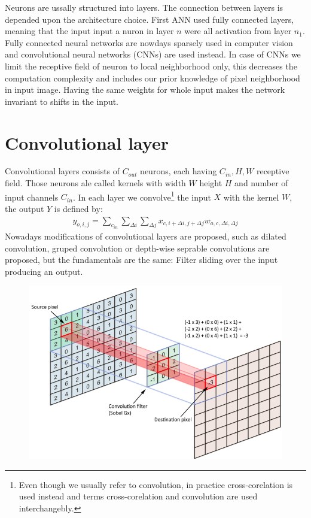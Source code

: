 Neurons are ussally structured into layers. The connection between layers is depended upon the architecture choice. First ANN used fully connected layers, meaning that the input input a nuron in layer $n$ were all activation from layer $n_1$. Fully connected neural networks are nowdays sparsely used in computer vision and convolutional neural networks (CNNs) are used instead. In case of CNNs we limit the receptive field of neuron to local neighborhood only, this decreases the computation complexity and includes our prior knowledge of pixel neighborhood in input image. Having the same weights for whole input makes the network invariant to shifts in the input.

\section{Convolutional layer}
Convolutional layers consists of $C_{out}$ neurons, each having $C_{in}, H, W$ receptive field. Those neurons ale called kernels with width $W$ height $H$ and number of input channels $C_{in}$. In each layer we convolve\footnote{Even though we usually refer to convolution, in practice cross-corelation is used instead and terms cross-corelation and convolution are used interchangebly.} the input $X$  with the kernel $W$, the output $Y$ is defined by:
\begin{align}
    y_{o,i,j} = \sum_{c_{in}} \sum_{\Delta i} \sum_{\Delta j} x_{c, i+\Delta i, j + \Delta j}  w_{o,c, \Delta i, \Delta j}
\end{align}
Nowadays modifications of convolutional layers are proposed, such as dilated convolution, gruped convolution or depth-wise seprable convolutions are proposed, but the fundamentals are the same: Filter sliding over the input producing an output.


\begin{figure}
    \centering
    \includegraphics[width=0.9\linewidth]{images/conv_img.png}
\end{figure}

